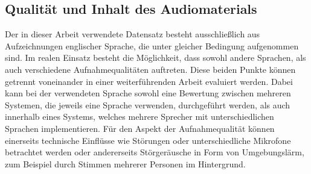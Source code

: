 \subsection{Qualität und Inhalt des Audiomaterials}
Der in dieser Arbeit verwendete Datensatz besteht ausschließlich aus Aufzeichnungen englischer Sprache, die unter gleicher Bedingung aufgenommen sind.
Im realen Einsatz besteht die Möglichkeit, dass sowohl andere Sprachen, als auch verschiedene Aufnahmequalitäten auftreten.
Diese beiden Punkte können getrennt voneinander in einer weiterführenden Arbeit evaluiert werden.
Dabei kann bei der verwendeten Sprache sowohl eine Bewertung zwischen mehreren Systemen, die jeweils eine Sprache verwenden, durchgeführt werden, als auch innerhalb eines Systems, welches mehrere Sprecher mit unterschiedlichen Sprachen implementieren.
Für den Aspekt der Aufnahmequalität können einerseits technische Einflüsse wie Störungen oder unterschiedliche Mikrofone betrachtet werden oder andererseits Störgeräusche in Form von Umgebungslärm, zum Beispiel durch Stimmen mehrerer Personen im Hintergrund.

\textauthor{\vHS}{}{}